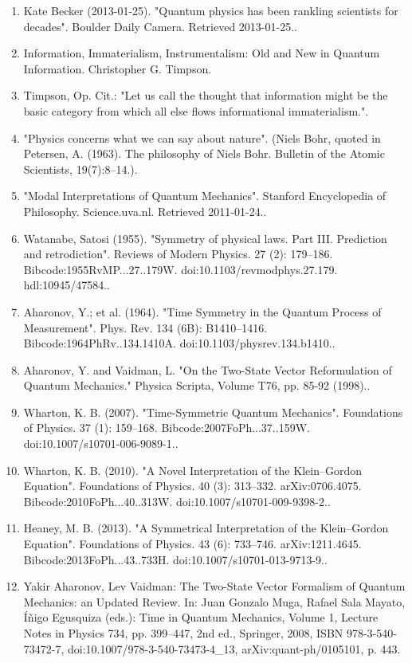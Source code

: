 \begin{enumerate}
\item Kate Becker (2013-01-25). "Quantum physics has been rankling scientists for decades". Boulder Daily Camera. Retrieved 2013-01-25..
\item Information, Immaterialism, Instrumentalism: Old and New in Quantum Information. Christopher G. Timpson.
\item Timpson, Op. Cit.: "Let us call the thought that information might be the basic category from which all else flows informational immaterialism.".
\item "Physics concerns what we can say about nature". (Niels Bohr, quoted in Petersen, A. (1963). The philosophy of Niels Bohr. Bulletin of the Atomic Scientists, 19(7):8–14.).
\item "Modal Interpretations of Quantum Mechanics". Stanford Encyclopedia of Philosophy. Science.uva.nl. Retrieved 2011-01-24..
\item Watanabe, Satosi (1955). "Symmetry of physical laws. Part III. Prediction and retrodiction". Reviews of Modern Physics. 27 (2): 179–186. Bibcode:1955RvMP...27..179W. doi:10.1103/revmodphys.27.179. hdl:10945/47584..
\item Aharonov, Y.; et al. (1964). "Time Symmetry in the Quantum Process of Measurement". Phys. Rev. 134 (6B): B1410–1416. Bibcode:1964PhRv..134.1410A. doi:10.1103/physrev.134.b1410..
\item Aharonov, Y. and Vaidman, L. "On the Two-State Vector Reformulation of Quantum Mechanics." Physica Scripta, Volume T76, pp. 85-92 (1998)..
\item Wharton, K. B. (2007). "Time-Symmetric Quantum Mechanics". Foundations of Physics. 37 (1): 159–168. Bibcode:2007FoPh...37..159W. doi:10.1007/s10701-006-9089-1..
\item Wharton, K. B. (2010). "A Novel Interpretation of the Klein–Gordon Equation". Foundations of Physics. 40 (3): 313–332. arXiv:0706.4075. Bibcode:2010FoPh...40..313W. doi:10.1007/s10701-009-9398-2..
\item Heaney, M. B. (2013). "A Symmetrical Interpretation of the Klein–Gordon Equation". Foundations of Physics. 43 (6): 733–746. arXiv:1211.4645. Bibcode:2013FoPh...43..733H. doi:10.1007/s10701-013-9713-9..
\item Yakir Aharonov, Lev Vaidman: The Two-State Vector Formalism of Quantum Mechanics: an Updated Review. In: Juan Gonzalo Muga, Rafael Sala Mayato, Íñigo Egusquiza (eds.): Time in Quantum Mechanics, Volume 1, Lecture Notes in Physics 734, pp. 399–447, 2nd ed., Springer, 2008, ISBN 978-3-540-73472-7, doi:10.1007/978-3-540-73473-4_13, arXiv:quant-ph/0105101, p. 443.

\end{enumerate}

